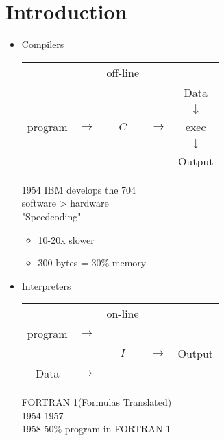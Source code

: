     \section{\textcolor{StanfordRed}{Introduction}}
    \begin{itemize}
        \item Compilers
            \begin{center}
                \begin{tabular}{c c c c c}
                    & & off-line & & \\
                    & & & & Data \\
                    & & & & \(\downarrow\) \\
                    program & \(\longrightarrow\) & \(\boxed{C}\) & \(\longrightarrow\) & exec \\
                    & & & & \(\downarrow\) \\
                    & & & & Output \\
                \end{tabular}
            \end{center}
            \begin{lightgrayleftbar}
                1954 IBM develops the 704 \\
                software > hardware \\
                "Speedcoding"
                \begin{itemize}
                    \item 10-20x slower
                    \item 300 bytes = 30\% memory
                \end{itemize}
            \end{lightgrayleftbar}

        \item Interpreters
            \begin{center}
                \begin{tabular}{c c c c c}
                    & & on-line & & \\
                    program & \(\longrightarrow\) & & & \\
                    & & \(\boxed{I}\) & \(\longrightarrow\) & Output \\
                    Data & \(\longrightarrow\) & & & \\
                \end{tabular}
            \end{center}
            \begin{lightgrayleftbar}\noindent
                FORTRAN 1(Formulas Translated) \\
                1954-1957 \\
                1958 50\% program in FORTRAN 1
                
            \end{lightgrayleftbar}
    \end{itemize}

